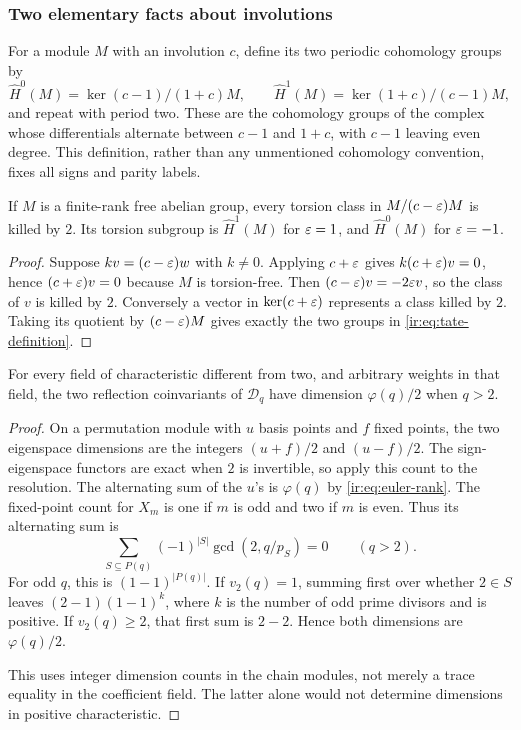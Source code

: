 \subsubsection{Two elementary facts about involutions}
For a module $M$ with an involution $c$, define its two periodic
cohomology groups by
\begin{equation}\label{ir:eq:tate-definition}
 \widehat H^0(M)=\ker(c-1)/(1+c)M,\qquad
 \widehat H^1(M)=\ker(1+c)/(c-1)M,
\end{equation}
and repeat with period two. These are the cohomology groups of the
complex whose differentials alternate between $c-1$ and $1+c$,
with $c-1$ leaving even degree. This definition, rather than any
unmentioned cohomology convention, fixes all signs and parity labels.

\begin{lemma}\label{ir:lem:torsion-tate}
If $M$ is a finite-rank free abelian group, every torsion class in
$M/(c-\varepsilon)M$ is killed by $2$. Its torsion subgroup is
$\widehat H^1(M)$ for $\varepsilon=1$, and $\widehat H^0(M)$ for $\varepsilon=-1$.
\end{lemma}
\begin{proof}
Suppose $k v=(c-\varepsilon)w$ with $k\ne0$. Applying $c+\varepsilon$ gives
$k(c+\varepsilon)v=0$, hence $(c+\varepsilon)v=0$ because $M$ is torsion-free.
Then $(c-\varepsilon)v=-2\varepsilon v$, so the class of $v$ is killed by $2$.
Conversely a vector in $\ker(c+\varepsilon)$ represents a class killed by
$2$. Taking its quotient by $(c-\varepsilon)M$ gives exactly the two groups
in \eqref{ir:eq:tate-definition}.
\end{proof}

\begin{lemma}\label{ir:lem:balanced}
For every field of characteristic different from two, and arbitrary
weights in that field, the two reflection coinvariants of $\mathcal D_q$
have dimension $\varphi(q)/2$ when $q>2$.
\end{lemma}
\begin{proof}
On a permutation module with $u$ basis points and $f$ fixed points,
the two eigenspace dimensions are the integers $(u+f)/2$ and
$(u-f)/2$. The sign-eigenspace functors are exact when $2$ is
invertible, so apply this count to the resolution. The alternating
sum of the $u$'s is $\varphi(q)$ by \eqref{ir:eq:euler-rank}.
The fixed-point count for $X_m$ is one if $m$ is odd and two if
$m$ is even. Thus its alternating sum is
\[
 \sum_{S\subseteq P(q)}(-1)^{|S|}\gcd(2,q/p_S)=0
 \qquad(q>2).
\]
For odd $q$, this is $(1-1)^{|P(q)|}$. If $v_2(q)=1$, summing
first over whether $2\in S$ leaves $(2-1)(1-1)^k$, where
$k$ is the number of odd prime divisors and is positive. If
$v_2(q)\ge2$, that first sum is $2-2$. Hence both dimensions
are $\varphi(q)/2$.

This uses integer dimension counts in the chain modules, not merely
a trace equality in the coefficient field. The latter alone would
not determine dimensions in positive characteristic.
\end{proof}

